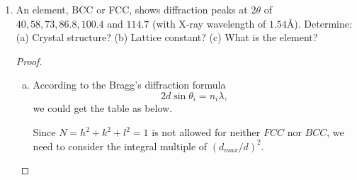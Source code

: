 \documentclass[reqno,a4paper,12pt]{amsart}
\begin{document}
\begin{enumerate}[1.]
\begin{proof}
	Utilizing the formula 
	\[
		I_{hkl} \propto M(h,k,l) \times \vert F(h,k,l) \vert^2 \times \frac{1+\cos^2(2\theta)}{\sin^2\theta\cos\theta},
	\] 
	
	the relative intensity for each $d_{hkl}$ with corresponding value of $\theta$ is 
	
\end{proof}

\medskip

\item An element, BCC or FCC, shows diffraction peaks at $2\theta$ of $40, 58, 73, 86.8, 100.4$ and $114.7$ (with X-ray wavelength of $1.54$\AA). Determine: (a) Crystal structure? (b) Lattice constant? (c) What is the element?

\begin{proof}
\begin{enumerate}[(a)]

\item According to the Bragg's diffraction formula 
\[
	2d\sin\theta_i = n_i \lambda,
\]
we could get the table as below.

\newpage
Since $N = h^2+k^2+l^2 = 1$ is not allowed for neither $FCC$ nor $BCC$, we need to consider the integral multiple of $(d_{max}/d)^2$. 


\end{enumerate}
\end{proof}
\end{enumerate}
\end{document}
